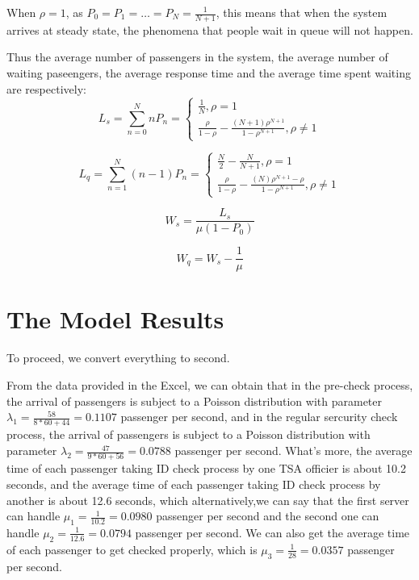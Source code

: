 \documentclass{mcmthesis}
\begin{document}
	When ${\rho = 1}$, as ${P_0 = P_1 = \dots =P_N =\frac{1}{N+1}}$, this means that when the system arrives at steady state, the phenomena that people wait in queue will not happen.

	Thus the average number of passengers in the system, the average number of waiting paseengers, the average response time and the average time spent waiting are respectively:
\begin{equation}    
L_s = \sum\limits_{n=0}^{N} nP_n= \left  \{
       \begin{array}{lr}
          \frac {1}{N}, \rho = 1\\
          \frac{\rho}{1-\rho} - \frac{(N+1) \rho^{N+1}}{1 - \rho^{N+1}} , \rho \ne 1
        \end{array}
\right.
\end{equation}
 
 \begin{equation}    
L_q = \sum\limits_{n=1}^{N} (n-1)P_n= \left  \{
       \begin{array}{lr}
          \frac {N}{2} - \frac{N}{N+1}, \rho = 1\\
          \frac{\rho}{1-\rho} - \frac{(N) \rho^{N+1} - \rho}{1 - \rho^{N+1}} , \rho \ne 1
        \end{array}
\right.
\end{equation}

\begin{equation}    
W_s = \frac{L_s}{\mu (1 - P_0)}
\end{equation}

\begin{equation}    
W_q = W_s - \frac{1}{\mu}
\end{equation}






\section{The Model Results}%
	To proceed, we convert everything to second.

	From the data provided in the Excel, we can obtain that in the pre-check process, the arrival of passengers is subject to a Poisson distribution with parameter ${\lambda_1 = \frac {58}{ 8 *60 + 44 } = 0.1107}$ passenger per second, and in the regular sercurity check process, the arrival of passengers is subject to a Poisson distribution with parameter ${\lambda_2 = \frac {47}{9 *60 + 56} = 0.0788}$ passenger per second. What's more, the average time of each passenger taking ID check process by one TSA officier is about 10.2 seconds, and the average time of each passenger taking ID check process by another is about 12.6 seconds, which alternatively,we can say that the first server can handle ${\mu_1 = \frac {1}{10.2} = 0.0980}$ passenger per second and the second one can handle ${\mu_2 = \frac {1}{12.6} = 0.0794}$ passenger per second. We can also get the average time of each passenger to get checked properly, which is ${\mu_3 = \frac{1}{28} = 0.0357}$ passenger per second.
\end{document}
